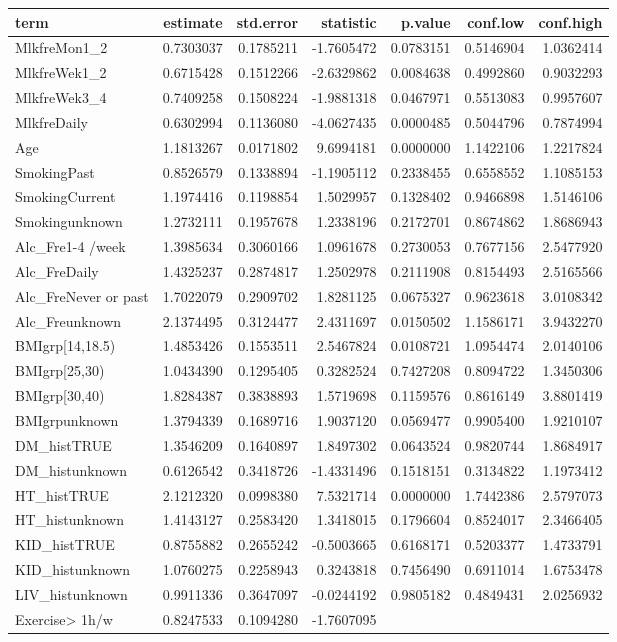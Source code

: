 \documentclass[]{article}
\begin{document}
\begin{longtable}[]{@{}lrrrrrr@{}}
\toprule
term & estimate & std.error & statistic & p.value & conf.low &
conf.high\tabularnewline
\midrule
\endhead
MlkfreMon1\_2 & 0.7303037 & 0.1785211 & -1.7605472 & 0.0783151 &
0.5146904 & 1.0362414\tabularnewline
MlkfreWek1\_2 & 0.6715428 & 0.1512266 & -2.6329862 & 0.0084638 &
0.4992860 & 0.9032293\tabularnewline
MlkfreWek3\_4 & 0.7409258 & 0.1508224 & -1.9881318 & 0.0467971 &
0.5513083 & 0.9957607\tabularnewline
MlkfreDaily & 0.6302994 & 0.1136080 & -4.0627435 & 0.0000485 & 0.5044796
& 0.7874994\tabularnewline
Age & 1.1813267 & 0.0171802 & 9.6994181 & 0.0000000 & 1.1422106 &
1.2217824\tabularnewline
SmokingPast & 0.8526579 & 0.1338894 & -1.1905112 & 0.2338455 & 0.6558552
& 1.1085153\tabularnewline
SmokingCurrent & 1.1974416 & 0.1198854 & 1.5029957 & 0.1328402 &
0.9466898 & 1.5146106\tabularnewline
Smokingunknown & 1.2732111 & 0.1957678 & 1.2338196 & 0.2172701 &
0.8674862 & 1.8686943\tabularnewline
Alc\_Fre1-4 /week & 1.3985634 & 0.3060166 & 1.0961678 & 0.2730053 &
0.7677156 & 2.5477920\tabularnewline
Alc\_FreDaily & 1.4325237 & 0.2874817 & 1.2502978 & 0.2111908 &
0.8154493 & 2.5165566\tabularnewline
Alc\_FreNever or past & 1.7022079 & 0.2909702 & 1.8281125 & 0.0675327 &
0.9623618 & 3.0108342\tabularnewline
Alc\_Freunknown & 2.1374495 & 0.3124477 & 2.4311697 & 0.0150502 &
1.1586171 & 3.9432270\tabularnewline
BMIgrp{[}14,18.5) & 1.4853426 & 0.1553511 & 2.5467824 & 0.0108721 &
1.0954474 & 2.0140106\tabularnewline
BMIgrp{[}25,30) & 1.0434390 & 0.1295405 & 0.3282524 & 0.7427208 &
0.8094722 & 1.3450306\tabularnewline
BMIgrp{[}30,40) & 1.8284387 & 0.3838893 & 1.5719698 & 0.1159576 &
0.8616149 & 3.8801419\tabularnewline
BMIgrpunknown & 1.3794339 & 0.1689716 & 1.9037120 & 0.0569477 &
0.9905400 & 1.9210107\tabularnewline
DM\_histTRUE & 1.3546209 & 0.1640897 & 1.8497302 & 0.0643524 & 0.9820744
& 1.8684917\tabularnewline
DM\_histunknown & 0.6126542 & 0.3418726 & -1.4331496 & 0.1518151 &
0.3134822 & 1.1973412\tabularnewline
HT\_histTRUE & 2.1212320 & 0.0998380 & 7.5321714 & 0.0000000 & 1.7442386
& 2.5797073\tabularnewline
HT\_histunknown & 1.4143127 & 0.2583420 & 1.3418015 & 0.1796604 &
0.8524017 & 2.3466405\tabularnewline
KID\_histTRUE & 0.8755882 & 0.2655242 & -0.5003665 & 0.6168171 &
0.5203377 & 1.4733791\tabularnewline
KID\_histunknown & 1.0760275 & 0.2258943 & 0.3243818 & 0.7456490 &
0.6911014 & 1.6753478\tabularnewline
LIV\_histunknown & 0.9911336 & 0.3647097 & -0.0244192 & 0.9805182 &
0.4849431 & 2.0256932\tabularnewline
Exercise\textgreater{} 1h/w & 0.8247533 & 0.1094280 & -1.7607095 &

\end{longtable}
\end{document}
